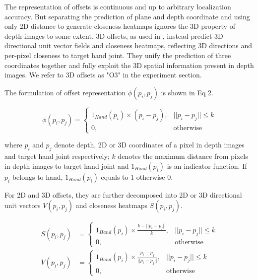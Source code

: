\documentclass[letterpaper]{article} \usepackage{aaai20}  \usepackage{times}  \usepackage{helvet} \usepackage{courier}  \usepackage[hyphens]{url}  \usepackage{graphicx} \usepackage{amsmath}
\begin{document}
The representation of offsets is continuous and up to arbitrary localization accuracy. But separating the prediction of plane and depth coordinate and using only 2D distance to generate closeness heatmaps ignores the 3D property of depth images to some extent. 3D offsets, as used in \cite{srn,dense3d}, instead predict 3D directional unit vector fields and closeness heatmaps, reflecting 3D directions and per-pixel closeness to target hand joint. They unify the prediction of three coordinates together and fully exploit the 3D spatial information present in depth images. We refer to 3D offsets as "O3" in the experiment section.

\parskip=0pt

The formulation of offset representation $\phi(p_i, p_j)$ is shown in Eq 2. 

\begin{small}
\begin{equation}
    \phi(p_i, p_j)=\left\{
        \begin{array}{ll}
            1_{Hand}(p_i)\times(p_i-p_j), & \textrm{$||p_i-p_j|| \leq k$}\\
            0, & \textrm{otherwise}
        \end{array} 
        \right.
\end{equation}
\end{small}

\parskip=0pt

\noindent where $p_i$ and $p_j$ denote depth, 2D or 3D coordinates of a pixel in depth images and target hand joint respectively; $k$ denotes the maximum distance from pixels in depth images to target hand joint and $1_{Hand}(p_i)$ is an indicator function. If $p_i$ belongs to hand, $1_{Hand}(p_i)$ equals to 1 otherwise 0.

\parskip=0pt

For 2D and 3D offsets, they are further decomposed into 2D or 3D directional unit vectors $V(p_i, p_j)$ and closeness heatmaps $S(p_i, p_j)$.  

\begin{small}
\begin{equation}
\begin{aligned}
    S(p_i, p_j) &= \left\{
        \begin{array}{ll}
            1_{Hand}(p_i)\times\frac{k-||p_i-p_j||}{k},&\textrm{$||p_i-p_j||\leq k$} \\
            0,&\textrm{otherwise}
        \end{array}
        \right.\\
    V(p_i, p_j) &= \left\{
        \begin{array}{ll}
            1_{Hand}(p_i)\times\frac{p_i-p_j}{||p_i-p_j||},&\textrm{$||p_i-p_j||\leq k$} \\
            0, & \textrm{otherwise}
        \end{array}
        \right.
\end{aligned}
\end{equation}
\end{small}
\end{document}
